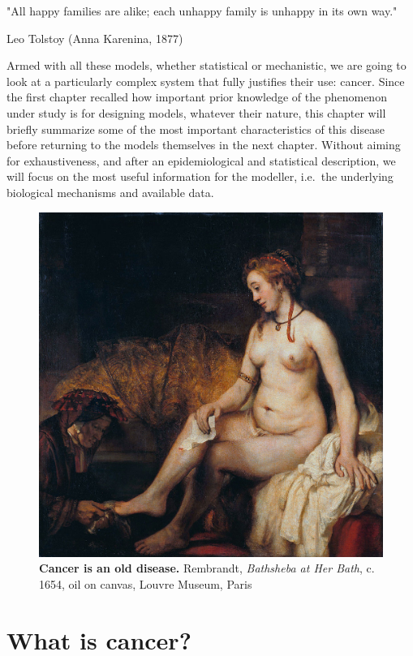 \documentclass[a4paper,12pt,twoside,onecolumn,openright,final,oldfontcommands]{memoir}
\newcommand{\initial}[1]{
	\lettrine[lines=3,lhang=0.33,nindent=0em]{
		\color{gray}
     		{\textsc{#1}}}{}}
\begin{document}
\epigraph{"All happy families are alike; each unhappy family is unhappy in its own way."}{Leo Tolstoy (Anna Karenina, 1877)}

\initial{A}rmed with all these models, whether statistical or
mechanistic, we are going to look at a particularly complex system that
fully justifies their use: cancer. Since the first chapter recalled how
important prior knowledge of the phenomenon under study is for designing
models, whatever their nature, this chapter will briefly summarize some
of the most important characteristics of this disease before returning
to the models themselves in the next chapter. Without aiming for
exhaustiveness, and after an epidemiological and statistical
description, we will focus on the most useful information for the
modeller, i.e.~the underlying biological mechanisms and available data.

\begin{figure}

{\centering \includegraphics[width=0.9\linewidth]{fig/bath} 

}

\caption[Cancer is an old disease]{\textbf{Cancer is an old disease.} Rembrandt,
\emph{Bathsheba at Her Bath}, c. 1654, oil on canvas, Louvre Museum,
Paris}\label{fig:bath}
\end{figure}





\section{What is cancer?}\label{what-is-cancer}
\end{document}
